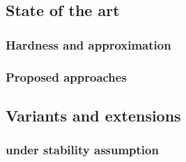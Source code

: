 \subsection{State of the art}
\label{sub:state_of_the_art}

\subsubsection{Hardness and approximation}
\label{ssub:cc_harness_approx}

\subsubsection{Proposed approaches}
\label{ssub:cc_methods}


\subsection{Variants and extensions}
\label{sub:variants_and_extensions}


\subsubsection{\pcc{} under stability assumption}
\label{ssub:cc_under_stability_assumption}

